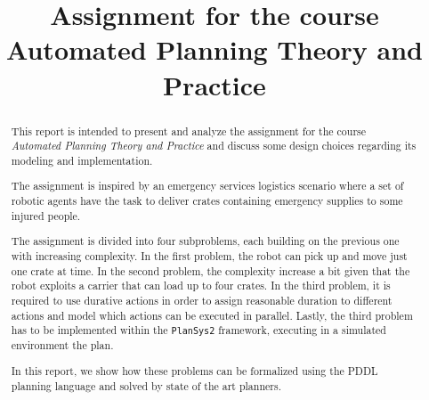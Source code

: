 \documentclass[conference]{IEEEtran}
\begin{document}
\title{Assignment for the course \\Automated Planning Theory and Practice\\
}

\author{
}

\maketitle

\begin{abstract}
This report is intended to present and analyze the assignment for the course 
\textit{Automated Planning Theory and Practice} \cite{assignment}
and discuss some design choices regarding its modeling and implementation.

The assignment is inspired by an emergency services logistics scenario where
a set of robotic agents have the task to deliver crates containing emergency 
supplies to some injured people.

The assignment is divided into four subproblems, each building on the previous 
one with increasing complexity.
In the first problem, the robot can pick up and move just one crate at time.
In the second problem, the complexity increase a bit given that the robot
exploits a carrier that can load up to four crates.
In the third problem, it is required to use durative actions in order to assign
reasonable duration to different actions and model which actions can be executed
in parallel.
Lastly, the third problem has to be implemented within the \texttt{PlanSys2} 
framework, executing in a simulated environment the plan.

In this report, we show how these problems can be formalized using the PDDL planning
language and solved by state of the art planners.

\end{abstract}











% 
% 

\printbibliography %
\end{document}
